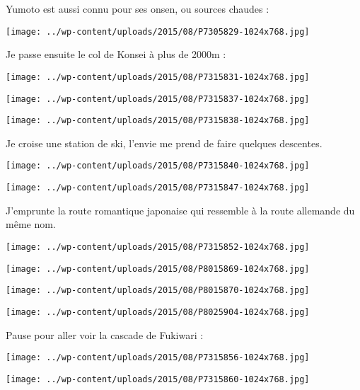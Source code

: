 \pagebreak
 Yumoto est aussi connu pour ses onsen, ou sources chaudes :
\begin{center} \texttt{[image: ../wp-content/uploads/2015/08/P7305829-1024x768.jpg]} \end{center}

 Je passe ensuite le col de Konsei à plus de 2000m :
\begin{center} \texttt{[image: ../wp-content/uploads/2015/08/P7315831-1024x768.jpg]} \end{center}
\begin{center} \texttt{[image: ../wp-content/uploads/2015/08/P7315837-1024x768.jpg]} \end{center}
\begin{center} \texttt{[image: ../wp-content/uploads/2015/08/P7315838-1024x768.jpg]} \end{center}

\pagebreak
 Je croise une station de ski, l'envie me prend de faire quelques descentes. 
\begin{center} \texttt{[image: ../wp-content/uploads/2015/08/P7315840-1024x768.jpg]} \end{center}
\begin{center} \texttt{[image: ../wp-content/uploads/2015/08/P7315847-1024x768.jpg]} \end{center}

\pagebreak
 J'emprunte la route romantique japonaise qui ressemble à la route allemande du même nom. 
\begin{center} \texttt{[image: ../wp-content/uploads/2015/08/P7315852-1024x768.jpg]} \end{center}
\begin{center} \texttt{[image: ../wp-content/uploads/2015/08/P8015869-1024x768.jpg]} \end{center}
\begin{center} \texttt{[image: ../wp-content/uploads/2015/08/P8015870-1024x768.jpg]} \end{center}
\begin{center} \texttt{[image: ../wp-content/uploads/2015/08/P8025904-1024x768.jpg]} \end{center}

\pagebreak
 Pause pour aller voir la cascade de Fukiwari :
\begin{center} \texttt{[image: ../wp-content/uploads/2015/08/P7315856-1024x768.jpg]} \end{center}
\begin{center} \texttt{[image: ../wp-content/uploads/2015/08/P7315860-1024x768.jpg]} \end{center}

